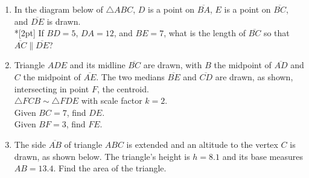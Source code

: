 \documentclass[12pt, twoside]{article}
\begin{document}
\begin{enumerate}
\newpage
\item In the diagram below of $\triangle ABC$, $D$ is a point on $\overline{BA}$, $E$ is a point on $\overline{BC}$, and $\overline{DE}$ is drawn. \\*[2pt] 
  If $BD=5$, $DA=12$, and $BE=7$, what is the length of $\overline{BC}$ so that $\overline{AC} \parallel \overline{DE}$?
  \begin{flushright}
    \end{flushright} \vspace{1cm}
  
\item Triangle $ADE$ and its midline $\overline{BC}$ are drawn, with $B$ the midpoint of $\overline{AD}$ and $C$ the midpoint of $\overline{AE}$. The two medians $\overline{BE}$ and $\overline{CD}$ are drawn, as shown, intersecting in point $F$, the centroid.\\[0.25cm]
  $\triangle FCB \sim \triangle FDE$ with scale factor $k=2$.\\[1cm]
  Given $BC=7$, find $DE$. \\[1cm] Given $BF=3$, find $FE$.
  \begin{flushright}
    \end{flushright} \vspace{1cm}
  
\newpage
\item The side $\overline{AB}$ of triangle $ABC$ is extended and an altitude to the vertex $C$ is drawn, as shown below. The triangle's height is $h=8.1$ and its base measures $AB=13.4$. Find the area of the triangle.
    \begin{flushright}
    \end{flushright}
    

\end{enumerate}
\end{document}
